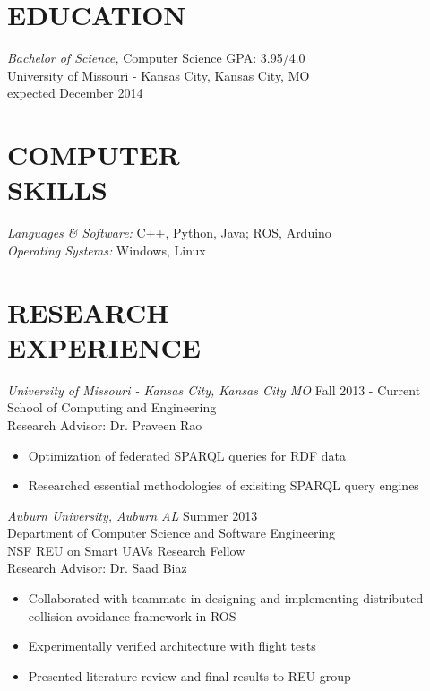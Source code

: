 \documentclass[line,margin]{res}
\begin{document}
\address{\hfill 11408 Colorado Ave \#12, Kansas City, MO 64137}
\address{\hfill (913)235-1070 \textbar \textbar \hspace{1 mm}  victoria.chen.wu@gmail.com} 

 
\begin{resume}
 
\section{EDUCATION} {\sl Bachelor of Science,} Computer Science	\hfill GPA: 3.95/4.0\\
                University of Missouri - Kansas City, Kansas City, MO \\
                expected December 2014 
\section{COMPUTER \\ SKILLS} {\sl Languages \& Software:} 
		C++, Python, Java; ROS, Arduino \\
                {\sl Operating Systems:} Windows, Linux 
\section {RESEARCH \\ EXPERIENCE}
		{\sl University of Missouri - Kansas City, Kansas City MO} \hfill Fall 2013 - Current \\
		School of Computing and Engineering \\
		Research Advisor: Dr. Praveen Rao
		 \begin{itemize} [leftmargin=5mm]  \itemsep -2pt %
		 \item  Optimization of federated SPARQL queries for RDF data
		\item   Researched essential methodologies of exisiting SPARQL query engines 
		\end{itemize}


		{\sl Auburn University, Auburn AL}  \hfill  Summer 2013\\
		Department of Computer Science and Software Engineering  \\
		NSF REU on Smart UAVs Research Fellow \\
		Research Advisor: Dr. Saad Biaz
                 \begin{itemize}[leftmargin=5mm]  \itemsep -2pt %
		 \item Collaborated with teammate in designing and implementing distributed collision avoidance framework in ROS 
		 \item Experimentally verified architecture with flight tests 
		 \item Presented literature review and final results to REU group 
                 \end{itemize} 
  

\end{resume}
\end{document}
